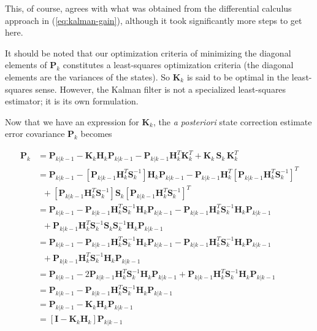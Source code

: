\documentclass[12pt]{article}
\begin{document}
This, of course, agrees with what was obtained from the differential calculus approach in
(\ref{eq:kalman-gain}), although it took significantly more steps to get here.

It should be noted that our optimization criteria of minimizing the diagonal elements of
$\mathbf{P}_k$ constitutes a least-squares optimization criteria (the diagonal elements
are the variances of the states). So $\mathbf{K}_k$ is said to be optimal in the
least-squares sense. However, the Kalman filter is not a specialized least-squares estimator;
it is its own formulation.

Now that we have an expression for $\mathbf{K}_k$, the \textit{a posteriori} state correction
estimate error covariance $\mathbf{P}_k$ becomes

\begin{equation*}
    \begin{aligned}
        \mathbf{P}_{k} &= \mathbf{P}_{k|k-1} - \mathbf{K}_k \mathbf{H}_k \mathbf{P}_{k|k-1} - \mathbf{P}_{k|k-1} \mathbf{H}_k^T \mathbf{K}_k^T
        + \mathbf{K}_k \, \mathbf{S}_k \, \mathbf{K}_k^T \\
        &= \mathbf{P}_{k|k-1}
        - \left[ \mathbf{P}_{k|k-1} \mathbf{H}_k^T \mathbf{S}_k^{-1} \right] \mathbf{H}_k \mathbf{P}_{k|k-1}
        - \mathbf{P}_{k|k-1} \mathbf{H}_k^T \left[ \mathbf{P}_{k|k-1} \mathbf{H}_k^T \mathbf{S}_k^{-1} \right]^T \\
        & \phantom{..} + \left[ \mathbf{P}_{k|k-1} \mathbf{H}_k^T \mathbf{S}_k^{-1} \right] \mathbf{S}_k \left[ \mathbf{P}_{k|k-1} \mathbf{H}_k^T \mathbf{S}_k^{-1} \right]^T \\
        &= \mathbf{P}_{k|k-1}
        - \mathbf{P}_{k|k-1} \mathbf{H}_k^T \mathbf{S}_k^{-1} \mathbf{H}_k \mathbf{P}_{k|k-1}
        - \mathbf{P}_{k|k-1} \mathbf{H}_k^T \mathbf{S}_k^{-1} \mathbf{H}_k \mathbf{P}_{k|k-1} \\
        & \phantom{..} + \mathbf{P}_{k|k-1} \mathbf{H}_k^T \mathbf{S}_k^{-1} \mathbf{S}_k \mathbf{S}_k^{-1} \mathbf{H}_k \mathbf{P}_{k|k-1} \\
        &= \mathbf{P}_{k|k-1}
        - \mathbf{P}_{k|k-1} \mathbf{H}_k^T \mathbf{S}_k^{-1} \mathbf{H}_k \mathbf{P}_{k|k-1}
        - \mathbf{P}_{k|k-1} \mathbf{H}_k^T \mathbf{S}_k^{-1} \mathbf{H}_k \mathbf{P}_{k|k-1} \\
        & \phantom{..} + \mathbf{P}_{k|k-1} \mathbf{H}_k^T \mathbf{S}_k^{-1} \mathbf{H}_k \mathbf{P}_{k|k-1} \\
        &= \mathbf{P}_{k|k-1}
        - 2 \mathbf{P}_{k|k-1} \mathbf{H}_k^T \mathbf{S}_k^{-1} \mathbf{H}_k \mathbf{P}_{k|k-1}
        + \mathbf{P}_{k|k-1} \mathbf{H}_k^T \mathbf{S}_k^{-1} \mathbf{H}_k \mathbf{P}_{k|k-1} \\
        &= \mathbf{P}_{k|k-1}
        - \mathbf{P}_{k|k-1} \mathbf{H}_k^T \mathbf{S}_k^{-1} \mathbf{H}_k \mathbf{P}_{k|k-1} \\
        &= \mathbf{P}_{k|k-1} - \mathbf{K}_k \mathbf{H}_k \mathbf{P}_{k|k-1} \\
        &= \left[ \mathbf{I} - \mathbf{K}_k \mathbf{H}_k \right] \mathbf{P}_{k|k-1}
    \end{aligned}
\end{equation*}
\end{document}
